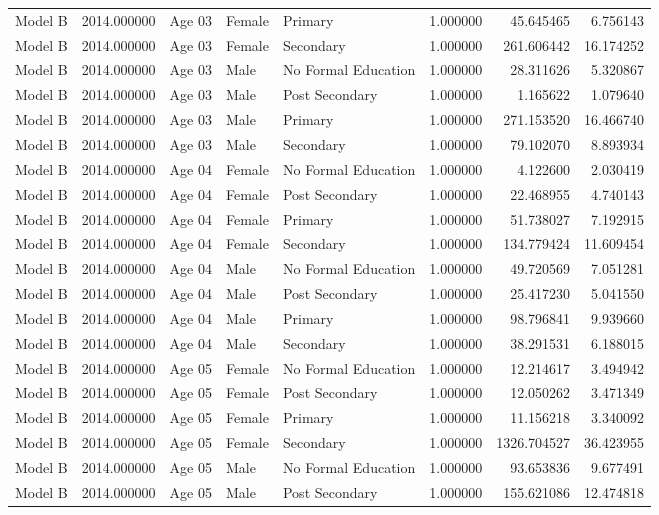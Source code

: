 \begin{table}[ht]
\begin{tabular}{lrlllrrr}
Model B & 2014.000000 & Age 03 & Female & Primary & 1.000000 & 45.645465 & 6.756143 \\
Model B & 2014.000000 & Age 03 & Female & Secondary & 1.000000 & 261.606442 & 16.174252 \\
Model B & 2014.000000 & Age 03 & Male & No Formal Education & 1.000000 & 28.311626 & 5.320867 \\
Model B & 2014.000000 & Age 03 & Male & Post Secondary & 1.000000 & 1.165622 & 1.079640 \\
Model B & 2014.000000 & Age 03 & Male & Primary & 1.000000 & 271.153520 & 16.466740 \\
Model B & 2014.000000 & Age 03 & Male & Secondary & 1.000000 & 79.102070 & 8.893934 \\
Model B & 2014.000000 & Age 04 & Female & No Formal Education & 1.000000 & 4.122600 & 2.030419 \\
Model B & 2014.000000 & Age 04 & Female & Post Secondary & 1.000000 & 22.468955 & 4.740143 \\
Model B & 2014.000000 & Age 04 & Female & Primary & 1.000000 & 51.738027 & 7.192915 \\
Model B & 2014.000000 & Age 04 & Female & Secondary & 1.000000 & 134.779424 & 11.609454 \\
Model B & 2014.000000 & Age 04 & Male & No Formal Education & 1.000000 & 49.720569 & 7.051281 \\
Model B & 2014.000000 & Age 04 & Male & Post Secondary & 1.000000 & 25.417230 & 5.041550 \\
Model B & 2014.000000 & Age 04 & Male & Primary & 1.000000 & 98.796841 & 9.939660 \\
Model B & 2014.000000 & Age 04 & Male & Secondary & 1.000000 & 38.291531 & 6.188015 \\
Model B & 2014.000000 & Age 05 & Female & No Formal Education & 1.000000 & 12.214617 & 3.494942 \\
Model B & 2014.000000 & Age 05 & Female & Post Secondary & 1.000000 & 12.050262 & 3.471349 \\
Model B & 2014.000000 & Age 05 & Female & Primary & 1.000000 & 11.156218 & 3.340092 \\
Model B & 2014.000000 & Age 05 & Female & Secondary & 1.000000 & 1326.704527 & 36.423955 \\
Model B & 2014.000000 & Age 05 & Male & No Formal Education & 1.000000 & 93.653836 & 9.677491 \\
Model B & 2014.000000 & Age 05 & Male & Post Secondary & 1.000000 & 155.621086 & 12.474818 \\

\end{tabular}
\end{table}
